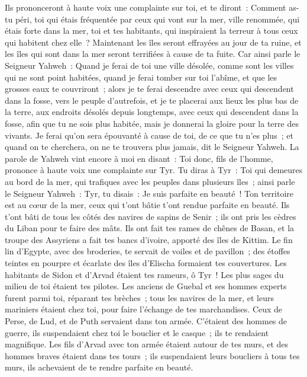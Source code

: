 \begin{multicols}{2}
Ils prononceront à haute voix une complainte sur toi, et te diront~: Comment as-tu péri, toi qui étais fréquentée par ceux qui vont sur la mer, ville renommée, qui étais forte dans la mer, toi et tes habitants, qui inspiraient la terreur à tous ceux qui habitent chez elle~?
Maintenant les îles seront effrayées au jour de ta ruine, et les îles qui sont dans la mer seront terrifiées à cause de ta fuite.
Car ainsi parle le Seigneur Yahweh~: Quand je ferai de toi une ville désolée, comme sont les villes qui ne sont point habitées, quand je ferai tomber sur toi l'abîme, et que les grosses eaux te couvriront~;
alors je te ferai descendre avec ceux qui descendent dans la fosse, vers le peuple d'autrefois, et je te placerai aux lieux les plus bas de la terre, aux endroits désolés depuis longtemps, avec ceux qui descendent dans la fosse, afin que tu ne sois plus habitée, mais je donnerai la gloire pour la terre des vivants.
Je ferai qu'on sera épouvanté à cause de toi, de ce que tu n'es plus~; et quand on te cherchera, on ne te trouvera plus jamais, dit le Seigneur Yahweh.
\VerseOne{}La parole de Yahweh vint encore à moi en disant~:
Toi donc, fils de l'homme, prononce à haute voix une complainte sur Tyr.
Tu diras à Tyr~: Toi qui demeures au bord de la mer, qui trafiques avec les peuples dans plusieurs îles~; ainsi parle le Seigneur Yahweh~: Tyr, tu disais~: Je suis parfaite en beauté~!
Ton territoire est au cœur de la mer, ceux qui t'ont bâtie t'ont rendue parfaite en beauté.
Ils t'ont bâti de tous les côtés des navires de sapins de Senir~; ils ont pris les cèdres du Liban pour te faire des mâts.
Ils ont fait tes rames de chênes de Basan, et la troupe des Assyriens a fait tes bancs d'ivoire, apporté des îles de Kittim.
Le fin lin d'Egypte, avec des broderies, te servait de voiles et de pavillon~; des étoffes teintes en pourpre et écarlate des îles d'Elischa formaient tes couvertures.
Les habitants de Sidon et d'Arvad étaient tes rameurs, ô Tyr~! Les plus sages du milieu de toi étaient tes pilotes.
Les anciens de Guebal et ses hommes experts furent parmi toi, réparant tes brèches~; tous les navires de la mer, et leurs mariniers étaient chez toi, pour faire l'échange de tes marchandises.
Ceux de Perse, de Lud, et de Puth servaient dans ton armée. C'étaient des hommes de guerre, ils suspendaient chez toi le bouclier et le casque~; ils te rendaient magnifique.
Les fils d'Arvad avec ton armée étaient autour de tes murs, et des hommes braves étaient dans tes tours~; ils suspendaient leurs boucliers à tous tes murs, ils achevaient de te rendre parfaite en beauté.

\end{multicols}
